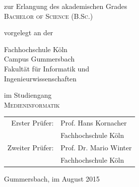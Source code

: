 \begin{titlepage}
\begin{center}
\vspace{1.0cm}

\begin{large}
zur Erlangung des akademischen Grades\\
\vspace{0.2cm}
\textsc{Bachelor of Science (B.Sc.)}\\ 
\end{large}

\vspace{0.4cm}

\begin{large}
vorgelegt an der\\ 
\vspace{0.2cm}
\begin{scshape}
Fachhochschule Köln\\
Campus Gummersbach\\
Fakultät für Informatik und\\
Ingenieurwissenschaften\\
\end{scshape}
\end{large}

\vspace{0.4cm}

\begin{large}
im Studiengang\\ 
\vspace{0.2cm}
\textsc{Medieninformatik}
\end{large}


\vspace{1.0cm}

\begin{tabular}{rl}
        Erster Prüfer:  &  Prof. Hans Kornacher\\
                &  \small Fachhochschule Köln \\[1.0em]
       Zweiter Prüfer:  &  Prof. Dr. Mario Winter\\
                &  \small Fachhochschule Köln\\
\end{tabular}

\vspace{0.6cm}

\begin{large}
Gummersbach, im August 2015
\end{large}


\end{center}
\end{titlepage}
